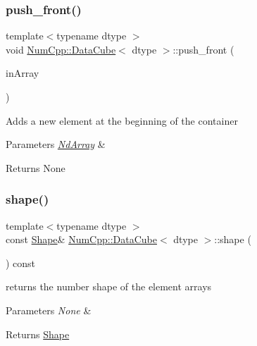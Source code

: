 \subsubsection{\texorpdfstring{push\+\_\+front()}{push\_front()}}
{\footnotesize\ttfamily template$<$typename dtype $>$ \\
void \mbox{\hyperlink{class_num_cpp_1_1_data_cube}{Num\+Cpp\+::\+Data\+Cube}}$<$ dtype $>$\+::push\+\_\+front (\begin{DoxyParamCaption}\item[{const \mbox{\hyperlink{class_num_cpp_1_1_nd_array}{Nd\+Array}}$<$ dtype $>$ \&}]{in\+Array }\end{DoxyParamCaption})\hspace{0.3cm}{\ttfamily [inline]}}

Adds a new element at the beginning of the container


\begin{DoxyParams}{Parameters}
{\em \mbox{\hyperlink{class_num_cpp_1_1_nd_array}{Nd\+Array}}} & \\
\hline
\end{DoxyParams}
\begin{DoxyReturn}{Returns}
None 
\end{DoxyReturn}
\mbox{\label{class_num_cpp_1_1_data_cube_a095037bf46062430413ef8ac9bb2dd2d}} 
\subsubsection{\texorpdfstring{shape()}{shape()}}
{\footnotesize\ttfamily template$<$typename dtype $>$ \\
const \mbox{\hyperlink{class_num_cpp_1_1_shape}{Shape}}\& \mbox{\hyperlink{class_num_cpp_1_1_data_cube}{Num\+Cpp\+::\+Data\+Cube}}$<$ dtype $>$\+::shape (\begin{DoxyParamCaption}{ }\end{DoxyParamCaption}) const\hspace{0.3cm}{\ttfamily [inline]}}

returns the number shape of the element arrays


\begin{DoxyParams}{Parameters}
{\em None} & \\
\hline
\end{DoxyParams}
\begin{DoxyReturn}{Returns}
\mbox{\hyperlink{class_num_cpp_1_1_shape}{Shape}} 
\end{DoxyReturn}
\mbox{\label{class_num_cpp_1_1_data_cube_aee2e2c47bc592149dfb4719613058b28}} 

